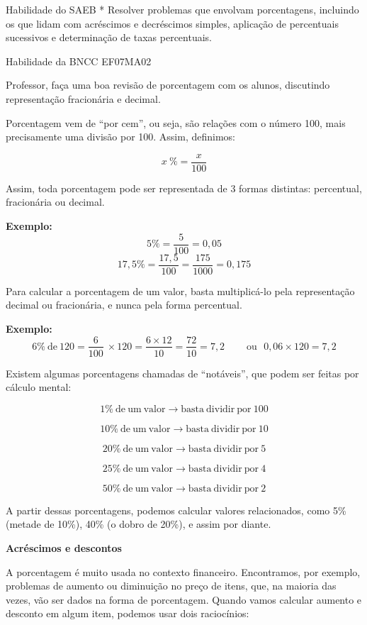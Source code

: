 Habilidade do SAEB * Resolver problemas que envolvam porcentagens,
incluindo os que lidam com acréscimos e decréscimos simples, aplicação
de percentuais sucessivos e determinação de taxas percentuais.

Habilidade da BNCC EF07MA02

Professor, faça uma boa revisão de porcentagem com os alunos, discutindo
representação fracionária e decimal.

Porcentagem vem de ``por cem'', ou seja, são relações com o número 100,
mais precisamente uma divisão por 100. Assim, definimos:

\[x\ \% = \frac{x}{100}\]

Assim, toda porcentagem pode ser representada de 3 formas distintas:
percentual, fracionária ou decimal.

\textbf{Exemplo:} \[5\% = \frac{5}{100} = 0,05\]
\[ 17,5\% = \frac{17,5}{100} = \frac{175}{1000} = 0,175\]

Para calcular a porcentagem de um valor, basta multiplicá-lo pela
representação decimal ou fracionária, e nunca pela forma percentual.

\textbf{Exemplo:}
\[6\%\ \text{de}\ 120 = \frac{6}{100}\  \times 120 = \frac{6 \times 12}{10} = \frac{72}{10} = 7,2\ \ \ \ \ \ \ \ \ \ \text{ou}\ \ \ 0,06 \times 120 = 7,2\]

Existem algumas porcentagens chamadas de ``notáveis'', que podem ser
feitas por cálculo mental:

\[1\%\ \text{de}\ \text{um}\ \text{valor} \rightarrow \text{basta}\ \text{dividir}\ \text{por}\ 100\]

\[10\%\ \text{de}\ \text{um}\ \text{valor} \rightarrow \text{basta}\ \text{dividir}\ \text{por}\ 10\]

\[20\%\ \text{de}\ \text{um}\ \text{valor} \rightarrow \text{basta}\ \text{dividir}\ \text{por}\ 5\]

\[25\%\ \text{de}\ \text{um}\ \text{valor} \rightarrow \text{bas}\text{ta}\ \text{dividir}\ \text{por}\ 4\]

\[50\%\ \text{de}\ \text{um}\ \text{valor} \rightarrow \text{basta}\ \text{dividir}\ \text{por}\ 2\]

A partir dessas porcentagens, podemos calcular valores relacionados,
como 5\% (metade de 10\%), 40\% (o dobro de 20\%), e assim por diante.

\textbf{Acréscimos e descontos}

A porcentagem é muito usada no contexto financeiro. Encontramos, por
exemplo, problemas de aumento ou diminuição no preço de itens, que, na
maioria das vezes, vão ser dados na forma de porcentagem. Quando vamos
calcular aumento e desconto em algum item, podemos usar dois
raciocínios:

